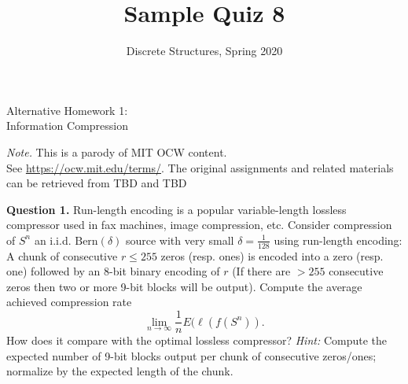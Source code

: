 \documentclass[jou]{apa6}
\title{Sample Quiz 8}
\author{Discrete Structures, Spring 2020}
\affiliation{RBS}
\begin{document}
\twocolumn
\thispagestyle{empty}

\begin{center}
{\Large Alternative Homework 1:}\\
{\Large Information Compression}
\end{center}


\begin{changemargin}{10pt}{10pt}
{\footnotesize
{\em Note.} This is a parody of MIT OCW content.\\
See \url{https://ocw.mit.edu/terms/}. 
The original assignments and related materials can be retrieved from 
TBD and TBD\\
}
\end{changemargin}


{\bf Question 1.} 
Run-length encoding is a popular variable-length lossless compressor used in fax machines, image
compression, etc. Consider compression of $S^n$ \textendash{} an i.i.d. $\text{Bern}(\delta)$ source with very small
$\delta = \frac{1}{128}$ using run-length encoding: A chunk of consecutive $r \leq 255$ zeros (resp. ones) 
is encoded into a zero (resp. one) followed by an 8-bit binary encoding of $r$ (If there are
$> 255$ consecutive zeros then two or more 9-bit blocks will be output). Compute the average
achieved compression rate
$$\lim_{n \rightarrow \infty} \frac{1}{n} E(\ell(f(S^n)).$$
How does it compare with the optimal lossless compressor?
{\em Hint:} 
Compute the expected number of 9-bit blocks output per chunk of consecutive zeros/ones; normalize by the expected length of the chunk.






\end{document}
